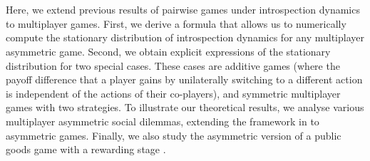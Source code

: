 \documentclass[11pt]{article}
\theoremstyle{plainCl1}
\theoremstyle{plainCl2}
\begin{document}
\\ \\
\noindent Here, we extend previous results \cite{Couto:NJP:2022} of pairwise games under introspection dynamics to multiplayer games. 
First, we derive a formula that allows us to numerically compute the stationary distribution of introspection dynamics for any multiplayer asymmetric game. 
Second, we obtain explicit expressions of the stationary distribution for two special cases. These cases are additive games (where the payoff difference that a player gains by unilaterally switching to a different action is independent of the actions of their co-players), and symmetric multiplayer games with two strategies. 
To illustrate our theoretical results, we analyse various multiplayer asymmetric social dilemmas, extending the framework in \cite{Hauert:JTB:2006a} to asymmetric games. Finally, we also study the asymmetric version of a public goods game with a rewarding stage \cite{Pal:NatCom:2022}.
\end{document}
